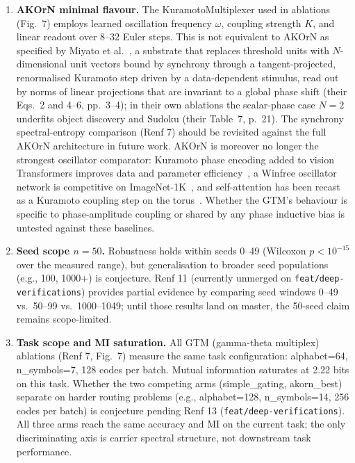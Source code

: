 \documentclass[10pt,twocolumn]{article}
\begin{document}
\begin{enumerate}
\item \textbf{AKOrN minimal flavour.} The KuramotoMultiplexer used in ablations (Fig.~7) employs learned oscillation frequency $\omega$, coupling strength $K$, and linear readout over 8--32 Euler steps. This is not equivalent to AKOrN as specified by Miyato et al.~\cite{miyato2025akorn}, a substrate that replaces threshold units with $N$-dimensional unit vectors bound by synchrony through a tangent-projected, renormalised Kuramoto step driven by a data-dependent stimulus, read out by norms of linear projections that are invariant to a global phase shift (their Eqs.~2 and 4--6, pp.~3--4); in their own ablations the scalar-phase case $N=2$ underfits object discovery and Sudoku (their Table~7, p.~21). The synchrony spectral-entropy comparison (Renf 7) should be revisited against the full AKOrN architecture in future work. AKOrN is moreover no longer the strongest oscillator comparator: Kuramoto phase encoding added to vision Transformers improves data and parameter efficiency~\cite{xiao2026kope}, a Winfree oscillator network is competitive on ImageNet-1K~\cite{dai2026wonn}, and self-attention has been recast as a Kuramoto coupling step on the torus~\cite{nunley2026kuramotoattn}. Whether the GTM's behaviour is specific to phase-amplitude coupling or shared by any phase inductive bias is untested against these baselines.

\item \textbf{Seed scope $n=50$.} Robustness holds within seeds 0--49 (Wilcoxon $p < 10^{-15}$ over the measured range), but generalisation to broader seed populations (e.g., 100, 1000+) is conjecture. Renf 11 (currently unmerged on \texttt{feat/deep-verifications}) provides partial evidence by comparing seed windows 0--49 vs.\ 50--99 vs.\ 1000--1049; until those results land on master, the 50-seed claim remains scope-limited.

\item \textbf{Task scope and MI saturation.} All GTM (gamma-theta multiplex) ablations (Renf 7, Fig.~7) measure the same task configuration: alphabet=64, n\_symbols=7, 128 codes per batch. Mutual information saturates at 2.22 bits on this task. Whether the two competing arms (simple\_gating, akorn\_best) separate on harder routing problems (e.g., alphabet=128, n\_symbols=14, 256 codes per batch) is conjecture pending Renf 13 (\texttt{feat/deep-verifications}). All three arms reach the same accuracy and MI on the current task; the only discriminating axis is carrier spectral structure, not downstream task performance.


\end{enumerate}
\end{document}
